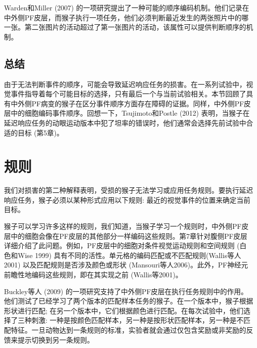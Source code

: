Warden和Miller (2007) 的一项研究提出了一种可能的顺序编码机制。他们记录在中外侧PF皮层，而猴子执行一项任务，他们必须判断最近发生的两张照片中的哪一张。第二张图片的活动超过了第一张图片的活动，该属性可以提供判断顺序的机制。
\subsection{总结}
由于无法判断事件的顺序，可能会导致延迟响应任务的损害。在一系列试验中，视觉事件指导着每个可能目标的选择，只有最后一个与当前试验相关。本节回顾了具有中外侧PF病变的猴子在区分事件顺序方面存在障碍的证据。同样，中外侧PF皮层中的细胞编码事件顺序。回想一下，Tsujimoto和Postle (2012) 表明，当猴子在延迟响应任务的动眼运动版本中犯了坦率的错误时，他们通常会选择先前试验中合适的目标 (第5章)。

\section{规则}
我们对损害的第二种解释表明，受损的猴子无法学习或应用任务规则。要执行延迟响应任务，猴子必须以某种形式应用以下规则: 最近的视觉事件的位置来确定当前目标。

猴子可以学习许多这样的规则，我们知道，当猴子学习一个规则时，中外侧PF皮层中的细胞会像在PF皮层的其他部分一样编码这些规则。第7章针对腹侧PF皮层详细介绍了此问题。例如，PF皮层中的细胞对条件视觉运动规则和空间规则 (白色和Wise 1999) 具有不同的活性。单元格的编码匹配或不匹配规则(Wallis等人2001) 以及匹配规则是否涉及颜色或形状 (Mansouri等人2006)。此外，PF神经元前瞻性地编码这些规则，即在其实现之前 (Wallis等2001)。

Buckley等人 (2009) 的一项研究支持了中外侧PF皮层在执行任务规则中的作用。他们测试了已经学习了两个版本的匹配样本任务的猴子。在一个版本中，猴子根据形状进行匹配; 在另一个版本中，它们根据颜色进行匹配。在每次试验中，他们选择了三种刺激: 一种是按颜色匹配样本，另一种是按形状匹配样本，另一种是不匹配特征。一旦动物达到一条规则的标准，实验者就会通过仅包含奖励或非奖励的反馈来提示切换到另一条规则。

